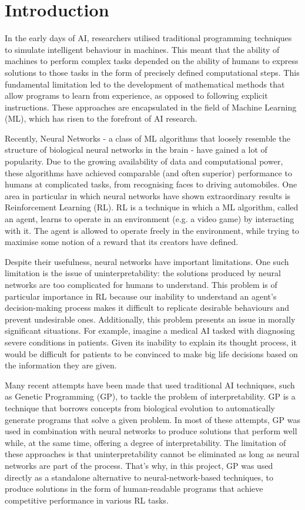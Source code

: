 \chapter{Introduction}
In the early days of AI, researchers utilised traditional programming techniques to simulate intelligent behaviour in machines. This meant that the ability of machines to perform complex tasks depended on the ability of humans to express solutions to those tasks in the form of precisely defined computational steps. This fundamental limitation led to the development of mathematical methods that allow programs to learn from experience, as opposed to following explicit instructions. These approaches are encapsulated in the field of Machine Learning (ML), which has risen to the forefront of AI research.

Recently, Neural Networks - a class of ML algorithms that loosely resemble the structure of biological neural networks in the brain - have gained a lot of popularity. Due to the growing availability of data and computational power, these algorithms have achieved comparable (and often superior) performance to humans at complicated tasks, from recognising faces to driving automobiles. One area in particular in which neural networks have shown extraordinary results is Reinforcement Learning (RL). RL is a technique in which a ML algorithm, called an agent, learns to operate in an environment (e.g. a video game) by interacting with it. The agent is allowed to operate freely in the environment, while trying to maximise some notion of a reward that its creators have defined.

Despite their usefulness, neural networks have important limitations. One such limitation is the issue of uninterpretability: the solutions produced by neural networks are too complicated for humans to understand. This problem is of particular importance in RL because our inability to understand an agent’s decision-making process makes it difficult to replicate desirable behaviours and prevent undesirable ones. Additionally, this problem presents an issue in morally significant situations. For example, imagine a medical AI tasked with diagnosing severe conditions in patients. Given its inability to explain its thought process, it would be difficult for patients to be convinced to make big life decisions based on the information they are given.

Many recent attempts have been made that used traditional AI techniques, such as Genetic Programming (GP), to tackle the problem of interpretability. GP is a technique that borrows concepts from biological evolution to automatically generate programs that solve a given problem. In most of these attempts, GP was used in combination with neural networks to produce solutions that perform well while, at the same time, offering a degree of interpretability. The limitation of these approaches is that uninterpretability cannot be eliminated as long as neural networks are part of the process. That’s why, in this project, GP was used directly as a standalone alternative to neural-network-based techniques, to produce solutions in the form of human-readable programs that achieve competitive performance in various RL tasks. 

